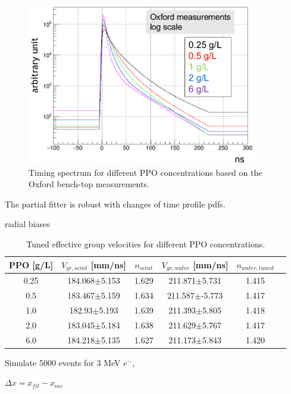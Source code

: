 \begin{figure}[!htb]
	\centering
	\includegraphics[width=10cm]{oxfordPdf_log.png}
	\caption{Timing spectrum for different PPO concentrations based on the Oxford bench-top measurements.}
	\label{oxfordPdf}
\end{figure}




The partial fitter is robust with changes of time profile pdfs.


radial biases
\begin{table}[ht]
	\centering
	\caption{\label{partial_groupV}Tuned effective group velocities for different PPO concentrations.}	
	{\centering
		\begin{tabular*}{140mm}{c@{\extracolsep{\fill}}ccccc}
			\toprule 
			PPO [g/L] & $V_{gr,scint}$ [mm/ns]& $n_{scint}$ & $V_{gr,water}$ [mm/ns]& $n_{water,tuned}$\\
			\midrule
			0.25 & 184.068$\pm$5.153 & 1.629 & 211.871$\pm$5.731 & 1.415\\
			0.5  & 183.467$\pm$5.159 &1.634& 211.587$\pm$-5.773 & 1.417 \\
			1.0 & 182.93$\pm$5.193 &1.639& 211.393$\pm$5.805& 1.418 \\
			2.0 & 183.045$\pm$5.184& 1.638& 211.629$\pm$5.767 & 1.417	\\
			6.0 & 184.218$\pm$5.135& 1.627& 211.173$\pm$5.843 &1.420\\
			\bottomrule	
		\end{tabular*}
	}
\end{table}


Simulate 5000 events for 3 MeV $e^-$,  


$\Delta x = x_{fit}-x_{mc}$

